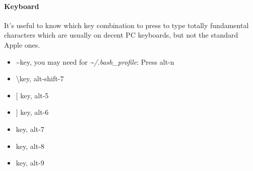 \paragraph{Keyboard}
It's useful to know which key combination to press to type totally fundamental characters which are usually on decent PC keyboards, but not the standard Apple ones.

\begin{itemize}
	\item \textasciitilde key, you may need for \emph{\textasciitilde /.bash\_profile}: Press alt-n
	\item \textbackslash key, alt-shift-7
	\item $[$ key, alt-5
	\item $]$ key, alt-6
	\item \textbar key, alt-7
	\item \textbraceleft key, alt-8
	\item \textbraceright key, alt-9
\end{itemize}
